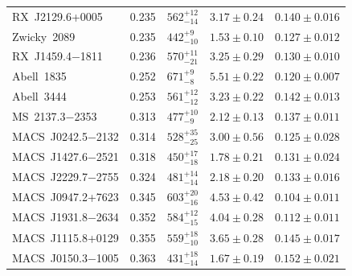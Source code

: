 \begin{table}
\begin{tabular}{lclcc}
    RX~J2129.6+0005      &  0.235  &  $562^{+12}_{-14}$  &                $3.17\pm0.24$   &  $0.140\pm0.016$\vspace{0.5ex}\\
    Zwicky~2089          &  0.235  &  $442^{+9}_{-10}$   &                $1.53\pm0.10$   &  $0.127\pm0.012$\vspace{0.5ex}\\
    RX~J1459.4$-$1811    &  0.236  &  $570^{+11}_{-21}$  &                $3.25\pm0.29$   &  $0.130\pm0.010$\vspace{0.5ex}\\
    Abell~1835           &  0.252  &  $671^{+9}_{-8}$    &                $5.51\pm0.22$   &  $0.120\pm0.007$\vspace{0.5ex}\\
    Abell~3444          &  0.253  &  $561^{+12}_{-12}$  &                $3.23\pm0.22$   &  $0.142\pm0.013$\vspace{0.5ex}\\
    MS~2137.3$-$2353     &  0.313  &  $477^{+10}_{-9}$   &                $2.12\pm0.13$   &  $0.137\pm0.011$\vspace{0.5ex}\\
    MACS~J0242.5$-$2132  &  0.314  &  $528^{+35}_{-25}$  &                $3.00\pm0.56$   &  $0.125\pm0.028$\vspace{0.5ex}\\
    MACS~J1427.6$-$2521  &  0.318  &  $450^{+17}_{-18}$  &                $1.78\pm0.21$   &  $0.131\pm0.024$\vspace{0.5ex}\\
    MACS~J2229.7$-$2755  &  0.324  &  $481^{+14}_{-14}$  &                $2.18\pm0.20$   &  $0.133\pm0.016$\vspace{0.5ex}\\
    MACS~J0947.2+7623    &  0.345  &  $603^{+20}_{-16}$  &                $4.53\pm0.42$   &  $0.104\pm0.011$\vspace{0.5ex}\\
    MACS~J1931.8$-$2634  &  0.352  &  $584^{+12}_{-15}$  &                $4.04\pm0.28$   &  $0.112\pm0.011$\vspace{0.5ex}\\
    MACS~J1115.8+0129    &  0.355  &  $559^{+18}_{-10}$  &                $3.65\pm0.28$   &  $0.145\pm0.017$\vspace{0.5ex}\\
    MACS~J0150.3$-$1005  &  0.363  &  $431^{+18}_{-14}$  &                $1.67\pm0.19$   &  $0.152\pm0.021$\vspace{0.5ex}\\

\end{tabular}
\end{table}
